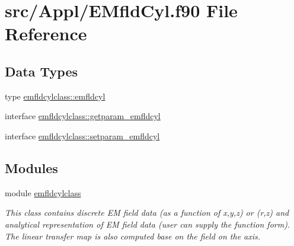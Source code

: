 \hypertarget{_e_mfld_cyl_8f90}{}\section{src/\+Appl/\+E\+Mfld\+Cyl.f90 File Reference}
\label{_e_mfld_cyl_8f90}
\subsection*{Data Types}
\begin{DoxyCompactItemize}
\item 
type \mbox{\hyperlink{namespaceemfldcylclass_structemfldcylclass_1_1emfldcyl}{emfldcylclass\+::emfldcyl}}
\item 
interface \mbox{\hyperlink{interfaceemfldcylclass_1_1getparam__emfldcyl}{emfldcylclass\+::getparam\+\_\+emfldcyl}}
\item 
interface \mbox{\hyperlink{interfaceemfldcylclass_1_1setparam__emfldcyl}{emfldcylclass\+::setparam\+\_\+emfldcyl}}
\end{DoxyCompactItemize}
\subsection*{Modules}
\begin{DoxyCompactItemize}
\item 
module \mbox{\hyperlink{namespaceemfldcylclass}{emfldcylclass}}
\begin{DoxyCompactList}\small\item\em This class contains discrete EM field data (as a function of x,y,z) or (r,z) and analytical representation of EM field data (user can supply the function form). The linear transfer map is also computed base on the field on the axis. \end{DoxyCompactList}\end{DoxyCompactItemize}
